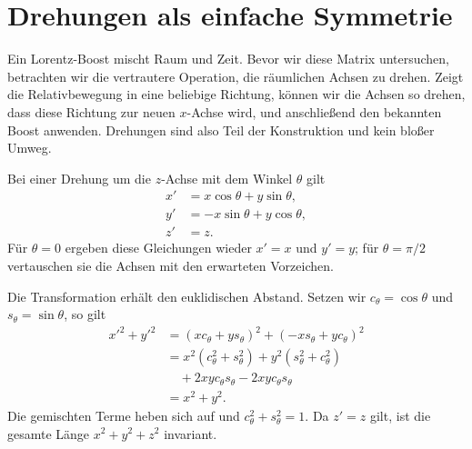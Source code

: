 \begin{classroomqa}
\end{classroomqa}

\section{Drehungen als einfache Symmetrie}

Ein Lorentz-Boost mischt Raum und Zeit. Bevor wir diese Matrix untersuchen, betrachten wir die vertrautere Operation, die räumlichen Achsen zu drehen. Zeigt die Relativbewegung in eine beliebige Richtung, können wir die Achsen so drehen, dass diese Richtung zur neuen \(x\)-Achse wird, und anschließend den bekannten Boost anwenden. Drehungen sind also Teil der Konstruktion und kein bloßer Umweg.

Bei einer Drehung um die \(z\)-Achse mit dem Winkel \(\theta\) gilt
\begin{align}
x'&=x\cos\theta+y\sin\theta,\nonumber\\
y'&=-x\sin\theta+y\cos\theta,\label{eq:l5-rotation}\\
z'&=z.\nonumber
\end{align}
Für \(\theta=0\) ergeben diese Gleichungen wieder \(x'=x\) und \(y'=y\); für \(\theta=\pi/2\) vertauschen sie die Achsen mit den erwarteten Vorzeichen.

Die Transformation erhält den euklidischen Abstand. Setzen wir
\(c_\theta=\cos\theta\) und \(s_\theta=\sin\theta\), so gilt
\begin{align}
x'^2+y'^2
&=(xc_\theta+ys_\theta)^2+(-xs_\theta+yc_\theta)^2\nonumber\\
&=x^2(c_\theta^2+s_\theta^2)
  +y^2(s_\theta^2+c_\theta^2)\nonumber\\
&\quad+2xyc_\theta s_\theta-2xyc_\theta s_\theta\nonumber\\
&=x^2+y^2.
\end{align}
Die gemischten Terme heben sich auf und \(c_\theta^2+s_\theta^2=1\). Da \(z'=z\) gilt, ist die gesamte Länge \(x^2+y^2+z^2\) invariant.

